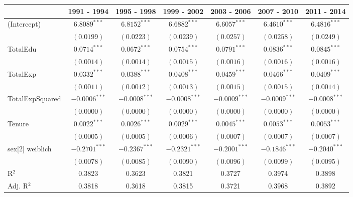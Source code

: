 
\begin{table}
\begin{center}
\begin{small}
\begin{tabular}{l c c c c c c }
\hline
 & 1991 - 1994 & 1995 - 1998 & 1999 - 2002 & 2003 - 2006 & 2007 - 2010 & 2011 - 2014 \\
\hline
(Intercept)     & $6.8089^{***}$  & $6.8152^{***}$  & $6.6882^{***}$  & $6.6057^{***}$  & $6.4610^{***}$  & $6.4816^{***}$  \\
                & $(0.0199)$      & $(0.0223)$      & $(0.0239)$      & $(0.0257)$      & $(0.0258)$      & $(0.0249)$      \\
TotalEdu        & $0.0714^{***}$  & $0.0672^{***}$  & $0.0754^{***}$  & $0.0791^{***}$  & $0.0836^{***}$  & $0.0845^{***}$  \\
                & $(0.0014)$      & $(0.0014)$      & $(0.0015)$      & $(0.0016)$      & $(0.0016)$      & $(0.0016)$      \\
TotalExp        & $0.0332^{***}$  & $0.0388^{***}$  & $0.0408^{***}$  & $0.0459^{***}$  & $0.0466^{***}$  & $0.0409^{***}$  \\
                & $(0.0011)$      & $(0.0012)$      & $(0.0013)$      & $(0.0015)$      & $(0.0015)$      & $(0.0014)$      \\
TotalExpSquared & $-0.0006^{***}$ & $-0.0008^{***}$ & $-0.0008^{***}$ & $-0.0009^{***}$ & $-0.0009^{***}$ & $-0.0008^{***}$ \\
                & $(0.0000)$      & $(0.0000)$      & $(0.0000)$      & $(0.0000)$      & $(0.0000)$      & $(0.0000)$      \\
Tenure          & $0.0022^{***}$  & $0.0026^{***}$  & $0.0029^{***}$  & $0.0045^{***}$  & $0.0053^{***}$  & $0.0053^{***}$  \\
                & $(0.0005)$      & $(0.0005)$      & $(0.0006)$      & $(0.0007)$      & $(0.0007)$      & $(0.0007)$      \\
sex[2] weiblich & $-0.2701^{***}$ & $-0.2367^{***}$ & $-0.2321^{***}$ & $-0.2001^{***}$ & $-0.1846^{***}$ & $-0.2040^{***}$ \\
                & $(0.0078)$      & $(0.0085)$      & $(0.0090)$      & $(0.0096)$      & $(0.0099)$      & $(0.0095)$      \\
\hline
R$^2$           & 0.3823          & 0.3623          & 0.3821          & 0.3727          & 0.3974          & 0.3898          \\
Adj. R$^2$      & 0.3818          & 0.3618          & 0.3815          & 0.3721          & 0.3968          & 0.3892          \\

\end{tabular}
\end{small}
\end{center}
\end{table}
